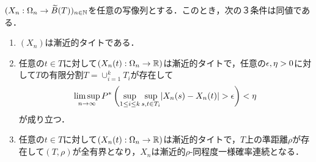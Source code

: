 \documentclass[uplatex,dvipdfmx]{jsreport}
\begin{document}
\begin{theorem}[漸近的タイト性の特徴付け]\label{thm-characterization-of-asymptotical-tightness}
    $(X_n:\Omega_n\to\widetilde{B}(T))_{n\in\mathbb{N}}$を任意の写像列とする．このとき，次の３条件は同値である．
    \begin{enumerate}
        \item $(X_n)$は漸近的タイトである．
        \item 任意の$t\in T$に対して$(X_n(t):\Omega_n\to\mathbb{R})$は漸近的タイトで，任意の$\epsilon,\eta>0$に対して$T$の有限分割$T=\cup_{i=1}^kT_i$が存在して
        \[\limsup_{n\to\infty} P^*\left(\sup_{1\le i\le k}\sup_{s,t\in T_i}\lvert X_n(s)-X_n(t)\rvert>\epsilon\right)<\eta\]
        が成り立つ．
        \item 任意の$t\in T$に対して$(X_n(t):\Omega_n\to\mathbb{R})$は漸近的タイトで，$T$上の準距離$\rho$が存在して$(T,\rho)$が全有界となり，$X_n$は漸近的$\rho$-同程度一様確率連続となる．
    \end{enumerate}
\end{theorem}
\end{document}
